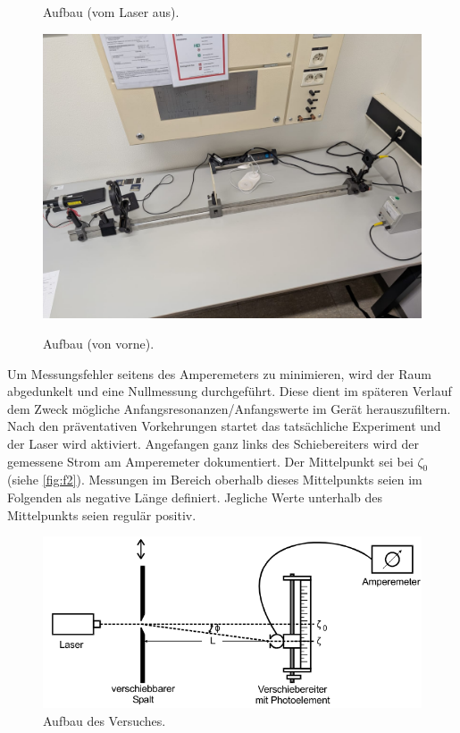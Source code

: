 \begin{figure}[H]
\begin{minipage}{0.45\textwidth}
        \caption{Aufbau (vom Laser aus).}
    \end{minipage}
    \hfill
    \begin{minipage}{0.53\textwidth}
        \label{fig:f3}
        \centering
        \includegraphics[width=\textwidth]{Bilder/A2.jpg}
        \caption{Aufbau (von vorne).}
    \end{minipage}
\end{figure}
\noindent Um Messungsfehler seitens des Amperemeters zu minimieren, wird der Raum 
abgedunkelt und eine Nullmessung durchgeführt. Diese dient im späteren Verlauf 
dem Zweck mögliche Anfangsresonanzen/Anfangswerte im Gerät herauszufiltern.
Nach den präventativen Vorkehrungen startet das tatsächliche Experiment und 
der Laser wird aktiviert. Angefangen ganz links des Schiebereiters wird der 
gemessene Strom am Amperemeter dokumentiert. Der Mittelpunkt sei bei $\zeta_0$
(siehe \autoref{fig:f2}).
Messungen im Bereich oberhalb dieses Mittelpunkts seien im Folgenden als 
negative Länge definiert. Jegliche Werte unterhalb des Mittelpunkts seien 
regulär positiv.
\begin{figure}[H]
    \centering
        \centering
        \includegraphics[width=1.0\textwidth]{Bilder/aufbau.png}
        \caption{Aufbau des Versuches. \cite{anleitung3}}
    \hfill
    \label{fig:f2}
\end{figure}
